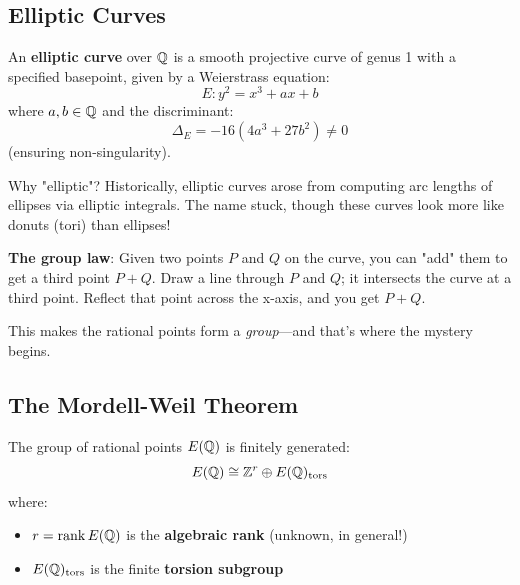\subsection{Elliptic Curves}

\begin{defn}\label{def:elliptic-curve}
An \textbf{elliptic curve} over $\mathbb{Q}$ is a smooth projective curve of genus 1 with a specified basepoint, given by a Weierstrass equation:
\begin{equation}
E: y^2 = x^3 + ax + b
\end{equation}
where $a, b \in \mathbb{Q}$ and the discriminant:
\begin{equation}
\Delta_E = -16(4a^3 + 27b^2) \neq 0
\end{equation}
(ensuring non-singularity).
\end{defn}

\begin{intuitive}
Why "elliptic"? Historically, elliptic curves arose from computing arc lengths of ellipses via elliptic integrals. The name stuck, though these curves look more like donuts (tori) than ellipses!

\textbf{The group law}: Given two points $P$ and $Q$ on the curve, you can "add" them to get a third point $P + Q$. Draw a line through $P$ and $Q$; it intersects the curve at a third point. Reflect that point across the x-axis, and you get $P + Q$.

This makes the rational points form a \textit{group}—and that's where the mystery begins.
\end{intuitive}

\subsection{The Mordell-Weil Theorem}

\begin{theorem}\label{thm:mordell-weil}
The group of rational points $E(\mathbb{Q})$ is finitely generated:
\begin{equation}
E(\mathbb{Q}) \cong \mathbb{Z}^r \oplus E(\mathbb{Q})_{\text{tors}}
\end{equation}
where:
\begin{itemize}
\item $r = \operatorname{rank} E(\mathbb{Q})$ is the \textbf{algebraic rank} (unknown, in general!)
\item $E(\mathbb{Q})_{\text{tors}}$ is the finite \textbf{torsion subgroup}
\end{itemize}
\end{theorem}

